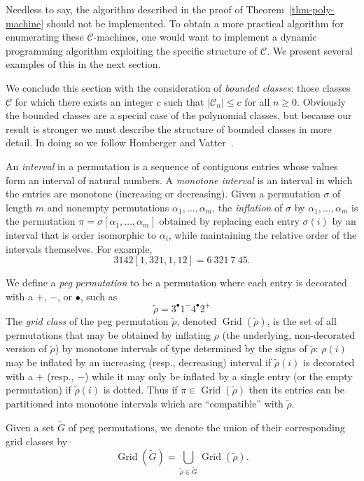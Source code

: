 \documentclass[10pt]{article}
\theoremstyle{plain}
\theoremstyle{definition}
\newcommand{\C}{\mathcal{C}}
\newcommand{\Grid}{\operatorname{Grid}}
\newcommand{\p}[1]{#1^+}
\newcommand{\m}[1]{#1^-}
\renewcommand{\d}[1]{#1^{\bullet}}
\begin{document}
Needless to say, the algorithm described in the proof of Theorem~\ref{thm-poly-machine} should not be implemented. To obtain a more practical algorithm for enumerating these $\C$-machines, one would want to implement a dynamic programming algorithm exploiting the specific structure of $\C$. We present several examples of this in the next section.

We conclude this section with the consideration of \emph{bounded classes}: those classes $\C$ for which there exists an integer $c$ such that $|\C_n| \leq c$ for all $n \geq 0$. Obviously the bounded classes are a special case of the polynomial classes, but because our result is stronger we must describe the structure of bounded classes in more detail. In doing so we follow Homberger and Vatter~\cite{homberger:on-the-effectiv:}.

An \emph{interval} in a permutation is a sequence of contiguous entries whose values form an interval of natural numbers. A \emph{monotone interval} is an interval in which the entries are monotone (increasing or decreasing).  Given a permutation $\sigma$ of length $m$ and nonempty permutations $\alpha_1,\dots,\alpha_m$, the \emph{inflation} of $\sigma$ by $\alpha_1,\dots,\alpha_m$ is the permutation $\pi=\sigma[\alpha_1,\dots,\alpha_m]$ obtained by replacing each entry $\sigma(i)$ by an interval that is order isomorphic to $\alpha_i$, while maintaining the relative order of the intervals themselves.  For example,
\[
	3142[1,321,1,12]=6\ 321\ 7\ 45.
\]

We define a \emph{peg permutation} to be a permutation where each entry is decorated with a $+$, $-$, or $\bullet$, such as
\[
\tilde{\rho}=\d3\m1\d4\p2
\]
The \emph{grid class} of the peg permutation $\tilde{\rho}$, denoted $\Grid(\tilde{\rho})$, is the set of all permutations that may be obtained by inflating $\rho$ (the underlying, non-decorated version of $\tilde{\rho}$) by monotone intervals of type determined by the signs of $\tilde{\rho}$: $\rho(i)$ may be inflated by an increasing (resp., decreasing) interval if $\tilde{\rho}(i)$ is decorated with a $+$ (resp., $-$) while it may only be inflated by a single entry (or the empty permutation) if $\tilde{\rho}(i)$ is dotted.  Thus if $\pi\in\Grid(\tilde{\rho})$ then its entries can be partitioned into monotone intervals which are ``compatible'' with $\tilde{\rho}$.

Given a set $\tilde{G}$ of peg permutations, we denote the union of their corresponding grid classes by
\[
\Grid(\tilde{G})=\bigcup_{\tilde{\rho}\in\tilde{G}} \Grid(\tilde{\rho}).
\]
\end{document}
